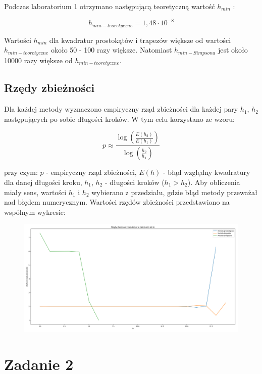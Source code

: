 \documentclass{article}
\begin{document}
	Podczas laboratorium 1 otrzymano następującą teoretyczną wartość $h_{min}$ :

	\begin{equation}
		h_{min - teoretyczne} = 1,48 \cdot 10 ^{-8}
	\end{equation}

	Wartości $h_{min}$ dla kwadratur prostokątów i trapezów większe od wartości $h_{min-teoretyczne}$ około 50 - 100 razy większe. Natomiast $h_{min-Simpsona}$ jest około 10000 razy większe od $h_{min-teoretyczne}$.


	\subsection*{Rzędy zbieżności}

	Dla każdej metody wyznaczono empiryczny rząd zbieżności dla każdej pary $h_1$, $h_2$ następujących po sobie długości kroków. W tym celu korzystano ze wzoru:

	\begin{equation}
		p \approx \frac{\log \left(\frac{E(h_2)}{E(h_1)}\right)}{\log \left(\frac{h_2}{h_1}\right)}
	\end{equation}

	przy czym: $p$ - empiryczny rząd zbieżności, $E(h)$ - błąd względny kwadratury dla danej długości kroku, $h_1$, $h_2$ - długości kroków ($h_1 > h_2$). Aby obliczenia miały sens, wartości $h_1$ i $h_2$ wybierano z przedziału, gdzie błąd metody przeważał nad błędem numerycznym. Wartości rzędów zbieżności przedstawiono na wspólnym wykresie:

	\begin{figure}[h]
		\centering
		\includegraphics[scale = 0.3]{wykres2.png}
	\end{figure}
	
	\newpage

	\section*{Zadanie 2}
\end{document}
